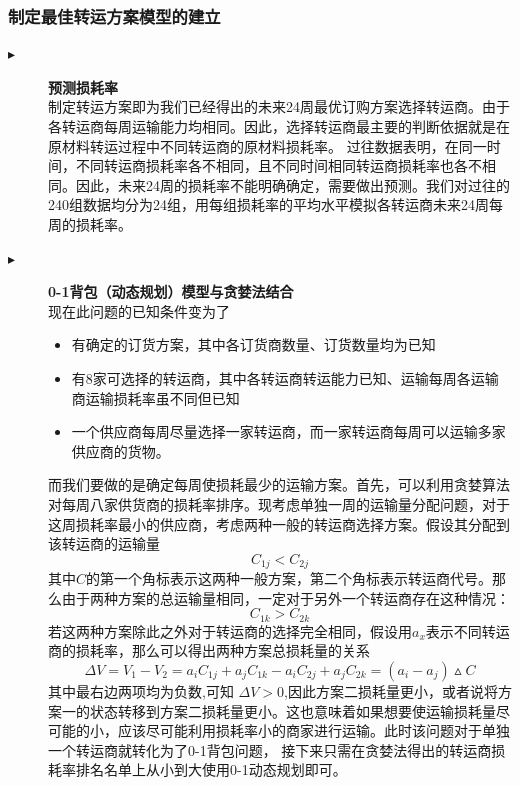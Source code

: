\documentclass{cumcmthesis}
\begin{document}
\subsubsection*{制定最佳转运方案模型的建立}
\begin{description}
    \item[$\blacktriangleright$]\textbf{预测损耗率}  \\
    制定转运方案即为我们已经得出的未来24周最优订购方案选择转运商。由于各转运商每周运输能力均相同。因此，选择转运商最主要的判断依据就是在原材料转运过程中不同转运商的原材料损耗率。
    过往数据表明，在同一时间，不同转运商损耗率各不相同，且不同时间相同转运商损耗率也各不相同。因此，未来24周的损耗率不能明确确定，需要做出预测。我们对过往的240组数据均分为24组，用每组损耗率的平均水平模拟各转运商未来24周每周的损耗率。
    \item[$\blacktriangleright$]\textbf{0-1背包（动态规划）模型与贪婪法结合}\\
    现在此问题的已知条件变为了
    \begin{itemize}
        \item 有确定的订货方案，其中各订货商数量、订货数量均为已知
        \item 有8家可选择的转运商，其中各转运商转运能力已知、运输每周各运输商运输损耗率虽不同但已知
        \item 一个供应商每周尽量选择一家转运商，而一家转运商每周可以运输多家供应商的货物。
    \end{itemize}
    而我们要做的是确定每周使损耗最少的运输方案。首先，可以利用贪婪算法对每周八家供货商的损耗率排序。现考虑单独一周的运输量分配问题，对于这周损耗率最小的供应商，考虑两种一般的转运商选择方案。假设其分配到该转运商的运输量
    \begin{equation}
        C_{1j}<C_{2j}\nonumber
    \end{equation}
    其中$C$的第一个角标表示这两种一般方案，第二个角标表示转运商代号。那么由于两种方案的总运输量相同，一定对于另外一个转运商存在这种情况：
    \begin{equation}
        C_{1k}>C_{2k}\nonumber
    \end{equation}
    若这两种方案除此之外对于转运商的选择完全相同，假设用$a_{x}$表示不同转运商的损耗率，那么可以得出两种方案总损耗量的关系
    \begin{equation}
        \Delta V= V_1-V_2=a_i C_{1j}+ a_j C_{1k}-a_i C_{2j} + a_j C_{2k}=(a_i-a_j)\vartriangle C\nonumber
    \end{equation}
    其中最右边两项均为负数,可知 $\Delta V >0$,因此方案二损耗量更小，或者说将方案一的状态转移到方案二损耗量更小。这也意味着如果想要使运输损耗量尽可能的小，应该尽可能利用损耗率小的商家进行运输。此时该问题对于单独一个转运商就转化为了0-1背包问题，
    接下来只需在贪婪法得出的转运商损耗率排名名单上从小到大使用0-1动态规划即可。
\end{description}
\end{document}
